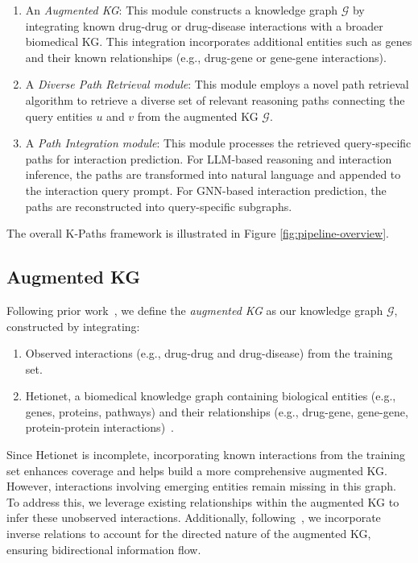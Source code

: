 \begin{enumerate}
    \item An \textit{Augmented KG}: This module constructs a knowledge graph $\mathcal{G}$ by integrating known drug-drug or drug-disease interactions with a broader biomedical KG. This integration incorporates additional entities such as genes and their known relationships (e.g., drug-gene or gene-gene interactions). 
    \item A \textit{Diverse Path Retrieval module}: This module employs a novel path retrieval algorithm to retrieve a diverse set of relevant reasoning paths connecting the query entities \( u \) and \( v \) from the augmented KG $\mathcal{G}$.
    \item A \textit{Path Integration module}: This module processes the retrieved query-specific paths for interaction prediction.
    For LLM-based reasoning and interaction inference, the paths are transformed into natural language and appended to the interaction query prompt.
    For GNN-based interaction prediction, the paths are reconstructed into query-specific subgraphs.
\end{enumerate}
The overall K-Paths framework is illustrated in Figure \ref{fig:pipeline-overview}.

\subsection{Augmented KG} \label{aug-network}
Following prior work~\citep{yu2021sumgnn, wang2024accurate, zhang2023emergingdruginteractionprediction}, we define the \textit{augmented KG} as our knowledge graph \(\mathcal{G}\), constructed by integrating:  
\begin{enumerate}
    \item Observed interactions (e.g., drug-drug and drug-disease) from the training set.
    \item Hetionet, a biomedical knowledge graph containing biological entities (e.g., genes, proteins, pathways) and their relationships (e.g., drug-gene, gene-gene, protein-protein interactions)~\citep{hetionet2017}.
\end{enumerate}


Since Hetionet is incomplete, incorporating known interactions from the training set enhances coverage and helps build a more comprehensive augmented KG. 
However, interactions involving emerging entities remain missing in this graph. To address this, we leverage existing relationships within the augmented KG to infer these unobserved interactions. Additionally, following~\citep{zhang2023emergingdruginteractionprediction}, we incorporate inverse relations to account for the directed nature of the augmented KG, ensuring bidirectional information flow.

